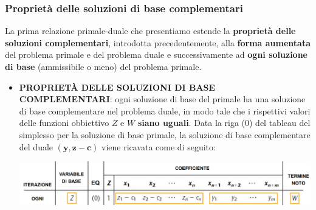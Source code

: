 \documentclass[12pt]{article}
\begin{document}
\subsubsection{Proprietà delle soluzioni di base complementari}
La prima relazione primale-duale che presentiamo estende la \textbf{proprietà delle soluzioni complementari}, introdotta precedentemente, alla \textbf{forma aumentata} del problema primale e del problema duale e successivamente ad \textbf{ogni soluzione di base}
(ammissibile o meno) del problema primale.
\begin{itemize}
    \item \textbf{PROPRIETÀ DELLE SOLUZIONI DI BASE COMPLEMENTARI}: ogni soluzione di base del primale ha una soluzione di base complementare nel problema duale, in modo tale che i rispettivi valori delle funzioni obbiettivo $Z$ e $W$ \textbf{siano uguali}.
    Data la riga (0) del tableau del simplesso per la soluzione di base primale, la soluzione di base complementare del duale $(\boldsymbol{y},\boldsymbol{z} - \boldsymbol{c})$ viene ricavata come di seguito:
    \begin{center}
        \includegraphics[width = 1\linewidth]{Images/50.png}
    \end{center}
\end{itemize}
\end{document}
